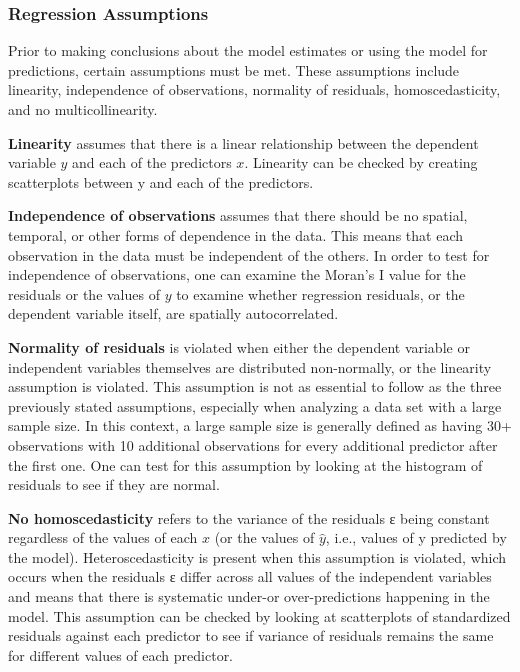 \documentclass[
]{article}
\begin{document}
\hypertarget{regression-assumptions}{%
\subsubsection{Regression Assumptions}\label{regression-assumptions}}

Prior to making conclusions about the model estimates or using the model
for predictions, certain assumptions must be met. These assumptions
include linearity, independence of observations, normality of residuals,
homoscedasticity, and no multicollinearity.

\textbf{Linearity} assumes that there is a linear relationship between
the dependent variable \(y\) and each of the predictors \(x\). Linearity
can be checked by creating scatterplots between y and each of the
predictors.

\textbf{Independence of observations} assumes that there should be no
spatial, temporal, or other forms of dependence in the data. This means
that each observation in the data must be independent of the others. In
order to test for independence of observations, one can examine the
Moran's I value for the residuals or the values of \(y\) to examine
whether regression residuals, or the dependent variable itself, are
spatially autocorrelated.

\textbf{Normality of residuals} is violated when either the dependent
variable or independent variables themselves are distributed
non-normally, or the linearity assumption is violated. This assumption
is not as essential to follow as the three previously stated
assumptions, especially when analyzing a data set with a large sample
size. In this context, a large sample size is generally defined as
having 30+ observations with 10 additional observations for every
additional predictor after the first one. One can test for this
assumption by looking at the histogram of residuals to see if they are
normal.

\textbf{No homoscedasticity} refers to the variance of the residuals ε
being constant regardless of the values of each \(x\) (or the values of
\(\widehat{y}\), i.e., values of y predicted by the model).
Heteroscedasticity is present when this assumption is violated, which
occurs when the residuals ε differ across all values of the independent
variables and means that there is systematic under-or over-predictions
happening in the model. This assumption can be checked by looking at
scatterplots of standardized residuals against each predictor to see if
variance of residuals remains the same for different values of each
predictor.
\end{document}
